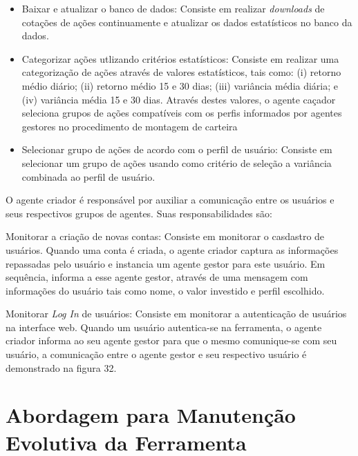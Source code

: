 \begin{description}
\begin{itemize}
\item Baixar e atualizar o banco de dados:\newline
Consiste em realizar \textit{downloads} de cotações de ações continuamente e atualizar os dados estatísticos no banco da dados. 
\item Categorizar ações utlizando critérios estatísticos:\newline
Consiste em realizar uma categorização de ações através de valores estatísticos, tais como: (i) retorno médio diário; (ii) retorno médio 15 e 30 dias; (iii) variância média diária; e (iv) variância média 15 e 30 dias. Através destes valores, o agente caçador seleciona grupos de ações compatíveis com os perfis informados por agentes gestores no procedimento de montagem de carteira
\item Selecionar grupo de ações de acordo com o perfil de usuário:\newline
Consiste em selecionar um grupo de ações usando como critério de seleção a variância combinada ao perfil de usuário.
\end{itemize}

\item[Agente criador (criator):]
 O agente criador é responsável por auxiliar a comunicação entre os usuários e seus respectivos grupos de agentes. Suas responsabilidades são: 

\item Monitorar a criação de novas contas:\newline
Consiste em monitorar o casdastro de usuários. Quando uma conta é criada, o agente criador captura as informações repassadas pelo usuário e instancia um agente gestor para este usuário. Em sequência, informa a esse agente gestor, através de uma mensagem com informações do usuário tais como nome, o valor investido e perfil escolhido.
\item Monitorar \textit{Log In} de usuários:\newline
Consiste em monitorar a autenticação de usuários na interface web. Quando um usuário autentica-se na ferramenta, o agente criador informa ao seu agente gestor para que o mesmo comunique-se com seu usuário, a comunicação entre o agente gestor e seu respectivo usuário é demonstrado na figura 32.

\end{description}



\section{Abordagem para Manutenção Evolutiva da Ferramenta}

